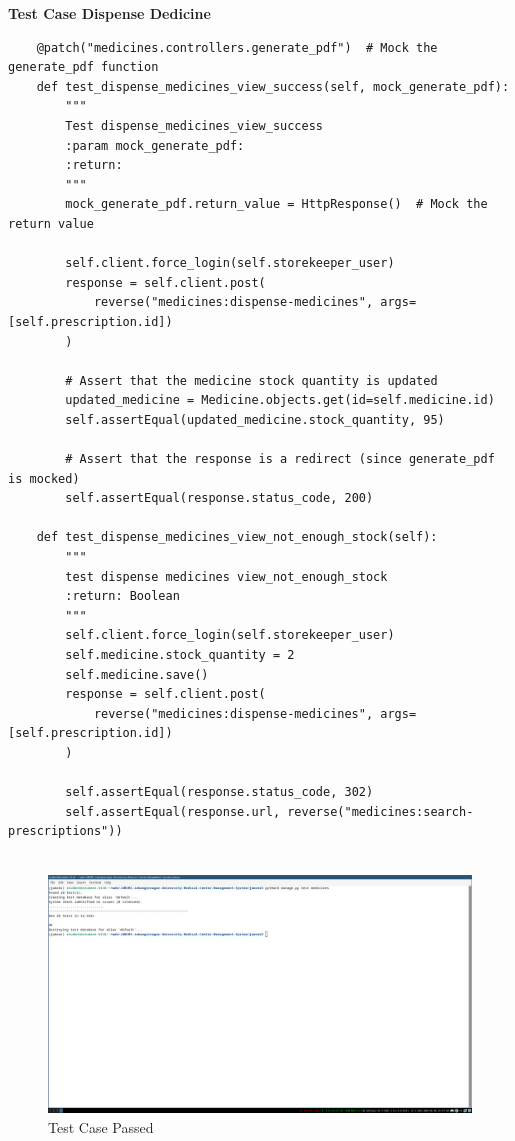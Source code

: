 \documentclass[a4paper,12pt]{article}
\begin{document}
\textbf{Test Case Dispense Dedicine}
\lstset{style=pythonSolarized}
\begin{lstlisting}
    @patch("medicines.controllers.generate_pdf")  # Mock the generate_pdf function
    def test_dispense_medicines_view_success(self, mock_generate_pdf):
        """
        Test dispense_medicines_view_success
        :param mock_generate_pdf:
        :return:
        """
        mock_generate_pdf.return_value = HttpResponse()  # Mock the return value

        self.client.force_login(self.storekeeper_user)
        response = self.client.post(
            reverse("medicines:dispense-medicines", args=[self.prescription.id])
        )

        # Assert that the medicine stock quantity is updated
        updated_medicine = Medicine.objects.get(id=self.medicine.id)
        self.assertEqual(updated_medicine.stock_quantity, 95)

        # Assert that the response is a redirect (since generate_pdf is mocked)
        self.assertEqual(response.status_code, 200)

    def test_dispense_medicines_view_not_enough_stock(self):
        """
        test dispense medicines view_not_enough_stock
        :return: Boolean
        """
        self.client.force_login(self.storekeeper_user)
        self.medicine.stock_quantity = 2
        self.medicine.save()
        response = self.client.post(
            reverse("medicines:dispense-medicines", args=[self.prescription.id])
        )

        self.assertEqual(response.status_code, 302)
        self.assertEqual(response.url, reverse("medicines:search-prescriptions"))


\end{lstlisting}
\begin{figure}[H]
    \centering
    \includegraphics[width=1\textwidth]{images/test2.png}
    \caption{Test Case Passed}
    \label{fig:testdispense}
\end{figure}
\end{document}
